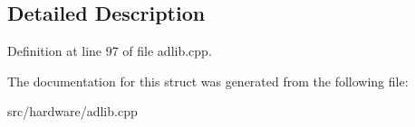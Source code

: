 \subsection{Detailed Description}


Definition at line 97 of file adlib.\-cpp.



The documentation for this struct was generated from the following file\-:\begin{DoxyCompactItemize}
\item 
src/hardware/adlib.\-cpp\end{DoxyCompactItemize}
